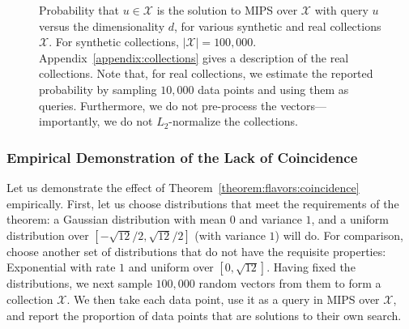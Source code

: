 \begin{figure}[t]
    \centering
    \hspace*{-1.5em}
    \caption{Probability that $u \in \mathcal{X}$ is the solution to MIPS over $\mathcal{X}$ with query $u$
    versus the dimensionality $d$, for various synthetic and real collections $\mathcal{X}$.
    For synthetic collections, $\lvert \mathcal{X} \rvert = 100{,}000$. Appendix~\ref{appendix:collections}
    gives a description of the real collections. Note that, for real collections, we estimate the reported
    probability by sampling $10{,}000$ data points and using them as queries. Furthermore,
    we do not pre-process the vectors---importantly, we do not $L_2$-normalize the collections.}
    \label{figure:flavors:coincidence}
\end{figure}

\subsubsection{Empirical Demonstration of the Lack of Coincidence}
Let us demonstrate the effect of Theorem~\ref{theorem:flavors:coincidence}
empirically. First, let us choose distributions that meet
the requirements of the theorem: a Gaussian distribution
with mean $0$ and variance $1$, and a uniform distribution over $[-\sqrt{12}/2, \sqrt{12}/2]$
(with variance $1$) will do.
For comparison, choose another set of distributions that do not have the requisite properties:
Exponential with rate $1$ and uniform over $[0, \sqrt{12}]$.
Having fixed the distributions, we next sample $100{,}000$ random vectors
from them to form a collection $\mathcal{X}$.
We then take each data point, use it as a query in MIPS over $\mathcal{X}$, and
report the proportion of data points that are solutions to their own search.

